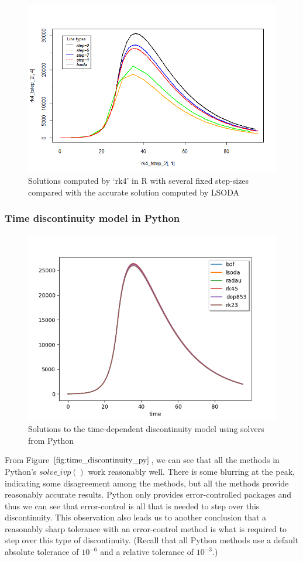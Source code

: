 \begin{figure}[H]
\centering
\includegraphics[width=0.7\linewidth]{./figures/rk4_messing_up_no_event_R}
\caption{Solutions computed by `rk4' in R with several fixed step-sizes compared with the accurate solution computed by LSODA}
\label{fig:rk4_messing_up_no_event_R}
\end{figure}


\subsubsection{Time discontinuity model in Python}
\begin{figure}[H]
\centering
\includegraphics[width=0.7\linewidth]{./figures/time_discontinuity_py}
\caption{Solutions to the time-dependent discontinuity model using solvers from Python}
\label{fig:time_discontinuity_py}
\end{figure}
From Figure $\ref{fig:time_discontinuity_py}$, we can see that all the methods in Python's $solve\_ivp()$ work reasonably well. There is some blurring at the peak, indicating some disagreement among the methods, but all the methods provide reasonably accurate results. Python only provides error-controlled packages and thus we can see that error-control is all that is needed to step over this discontinuity. This observation also leads us to another conclusion that a reasonably sharp tolerance with an error-control method is what is required to step over this type of discontinuity. (Recall that all Python methods use a default absolute tolerance of $10^{-6}$ and a relative tolerance of $10^{-3}$.)

